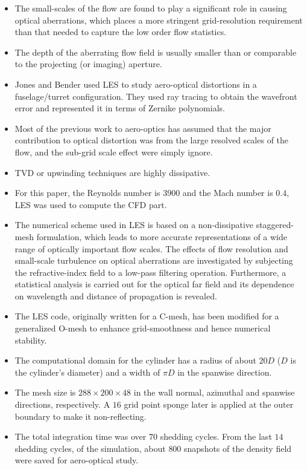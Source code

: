         \begin{itemize}
            \item The small-scales of the flow are found to play a significant role in causing optical aberrations, which places a more stringent grid-resolution requirement than that needed to capture the low order flow statistics. 
            \item The depth of the aberrating flow field is usually smaller than or comparable to the projecting (or imaging) aperture.
            \item Jones and Bender used LES to study aero-optical distortions in a fuselage/turret configuration. They used ray tracing to obtain the wavefront error and represented it in terms of Zernike polynomials. 
            \item Most of the previous work to aero-optics has assumed that the major contribution to optical distortion was from the large resolved scales of the flow, and the sub-grid scale effect were simply ignore. 
            \item TVD or upwinding techniques are highly dissipative. 
            \item For this paper, the Reynolds number is $3900$ and the Mach number is $0.4$, LES was used to compute the CFD part.  
            \item The numerical scheme used in LES is based on a non-dissipative staggered-mesh formulation, which leads to more accurate representations of a wide range of optically important flow scales. The effects of flow resolution and small-scale turbulence on optical aberrations are investigated by subjecting the refractive-index field to a low-pass filtering operation. Furthermore, a statistical analysis is carried out for the optical far field and its dependence on wavelength and distance of propagation is revealed. 
            \item The LES code, originally written for a C-mesh, has been modified for a generalized O-mesh to enhance grid-smoothness and hence numerical stability.
            \item The computational domain for the cylinder has a radius of about $20D$ ($D$ is the cylinder's diameter) and a width of $\pi D$ in the spanwise direction. 
            \item The mesh size is $288\times 200\times 48$ in the wall normal, azimuthal and spanwise directions, respectively. A $16$ grid point sponge later is applied at the outer boundary to make it non-reflecting. 
            \item The total integration time was over $70$ shedding cycles. From the last $14$ shedding cycles, of the simulation, about $800$ snapshots of the density field were saved for aero-optical study. 

\end{itemize}
